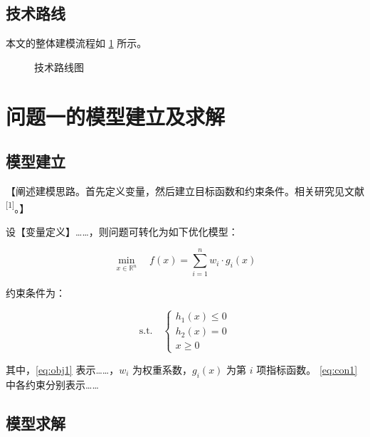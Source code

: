 \documentclass[withoutpreface,bwprint]{cumcmthesis}
\newcommand{\scite}[1]{\textsuperscript{[#1]}}
\begin{document}
\subsection{技术路线}

本文的整体建模流程如 \cref{fig:flowchart} 所示。

\begin{figure}[H]
    \centering
    \caption{技术路线图}
    \label{fig:flowchart}
\end{figure}

\section{问题一的模型建立及求解}

\subsection{模型建立}

【阐述建模思路。首先定义变量，然后建立目标函数和约束条件。相关研究见文献\scite{1}。】

设【变量定义】……，则问题可转化为如下优化模型：

\begin{equation}
    \min_{x \in \mathbb{R}^n} \quad f(x) = \sum_{i=1}^{n} w_i \cdot g_i(x)
    \label{eq:obj1}
\end{equation}

约束条件为：

\begin{equation}
    \text{s.t.} \quad
    \begin{cases}
        h_1(x) \leq 0 \\
        h_2(x) = 0    \\
        x \geq 0
    \end{cases}
    \label{eq:con1}
\end{equation}

其中，\cref{eq:obj1} 表示……，$w_i$ 为权重系数，$g_i(x)$ 为第 $i$ 项指标函数。
\cref{eq:con1} 中各约束分别表示……

\subsection{模型求解}
\end{document}
